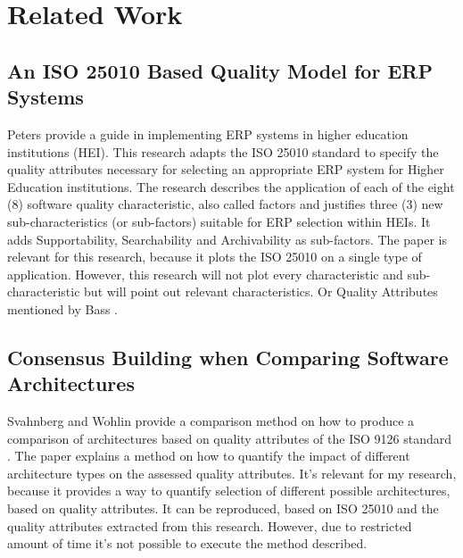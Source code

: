 \chapter{Related Work}\label{s:related}


\section*{An ISO 25010 Based Quality Model for ERP Systems}
Peters \etal \cite{Peters2020AnI2} provide a guide in implementing ERP systems in higher education institutions (HEI). This research adapts the ISO 25010 standard to specify the quality attributes necessary for selecting an appropriate ERP system for Higher Education institutions. The research describes the application of each of the eight (8) software quality characteristic, also called factors and justifies three (3) new sub-characteristics (or sub-factors) suitable for ERP selection within HEIs. It adds Supportability, Searchability and Archivability as sub-factors. The paper is relevant for this research, because it plots the ISO 25010 on a single type of application. However, this research will not plot every characteristic and sub-characteristic but will point out relevant characteristics. Or Quality Attributes mentioned by Bass \etal \cite{Bass2015SoftwareAI}.

\section*{Consensus Building when Comparing Software Architectures}
Svahnberg and Wohlin \cite{Svahnberg2002ConsensusBW} provide a comparison method on how to produce a comparison of architectures based on quality attributes of the ISO 9126 standard \cite{ISO9126}. The paper explains a method on how to quantify the impact of different architecture types on the assessed quality attributes. It's relevant for my research, because it provides a way to quantify selection of different possible architectures, based on quality attributes. It can be reproduced, based on ISO 25010 and the quality attributes extracted from this research. However, due to restricted amount of time it's not possible to execute the method described. 

